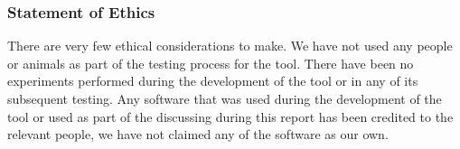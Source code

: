 \documentclass{UoYCSproject}
\begin{document}
\begin{summary}
    \subsubsection{Statement of Ethics}
    There are very few ethical considerations to make.
    We have not used any people or animals as part of the testing process for the tool.
    There have been no experiments performed during the development of the tool or in any of its subsequent testing.
    Any software that was used during the development of the tool or used as part of the discussing during this report has been credited to the relevant people, we have not claimed any of the software as our own.

    \end{summary}





\printbibliography


\end{document}
